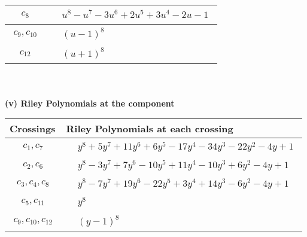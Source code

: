 \documentclass[1p]{elsarticle_modified}
\theoremstyle{definition}
\begin{document}
\begin{tabular}{m{50pt}|m{274pt}}
\hline $$\begin{aligned}c_{8}\end{aligned}$$&$\begin{aligned}
&u^8- u^7-3 u^6+2 u^5+3 u^4-2 u-1
\end{aligned}$\\
\hline $$\begin{aligned}c_{9},c_{10}\end{aligned}$$&$\begin{aligned}
&(u-1)^8
\end{aligned}$\\
\hline $$\begin{aligned}c_{12}\end{aligned}$$&$\begin{aligned}
&(u+1)^8
\end{aligned}$\\
\hline
\end{tabular}\\~\\
\newpage\renewcommand{\arraystretch}{1}
\flushleft \textbf{(v) Riley Polynomials at the component}\newline \\
\begin{tabular}{m{50pt}|m{274pt}}
Crossings & \hspace{64pt}Riley Polynomials at each crossing \\
\hline $$\begin{aligned}c_{1},c_{7}\end{aligned}$$&$\begin{aligned}
&y^8+5 y^7+11 y^6+6 y^5-17 y^4-34 y^3-22 y^2-4 y+1
\end{aligned}$\\
\hline $$\begin{aligned}c_{2},c_{6}\end{aligned}$$&$\begin{aligned}
&y^8-3 y^7+7 y^6-10 y^5+11 y^4-10 y^3+6 y^2-4 y+1
\end{aligned}$\\
\hline $$\begin{aligned}c_{3},c_{4},c_{8}\end{aligned}$$&$\begin{aligned}
&y^8-7 y^7+19 y^6-22 y^5+3 y^4+14 y^3-6 y^2-4 y+1
\end{aligned}$\\
\hline $$\begin{aligned}c_{5},c_{11}\end{aligned}$$&$\begin{aligned}
&y^8
\end{aligned}$\\
\hline $$\begin{aligned}c_{9},c_{10},c_{12}\end{aligned}$$&$\begin{aligned}
&(y-1)^8
\end{aligned}$\\
\hline
\end{tabular}\\~\\
\end{document}
